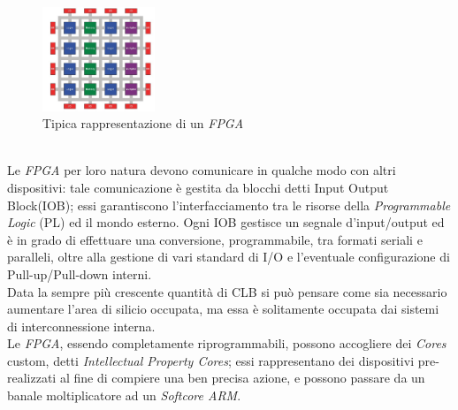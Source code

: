 \begin{figure}[h]
\centering
\includegraphics[width=0.3\textwidth]{images/FPGA.jpg}
\caption{Tipica rappresentazione di un \textit{FPGA} \cite{8187326}}
\end{figure}\\
Le \textit{FPGA} per loro natura devono comunicare in qualche modo con altri dispositivi: tale comunicazione è gestita da blocchi detti Input Output Block(IOB); essi garantiscono l'interfacciamento tra le risorse della \textit{Programmable Logic} (PL) ed il mondo esterno. Ogni IOB gestisce un segnale d'input/output ed è in grado di effettuare una conversione, programmabile, tra formati seriali e paralleli, oltre alla gestione di vari standard di I/O e l'eventuale configurazione di Pull-up/Pull-down interni.\\
Data la sempre più crescente quantità di CLB si può pensare come sia necessario aumentare l'area di silicio occupata, ma essa è solitamente occupata dai sistemi di interconnessione interna.\\
Le \textit{FPGA}, essendo completamente riprogrammabili, possono accogliere dei \textit{Cores} custom, detti \textit{Intellectual Property Cores}; essi rappresentano dei dispositivi pre-realizzati al fine di compiere una ben precisa azione, e possono passare da un banale moltiplicatore ad un \textit{Softcore ARM}.
